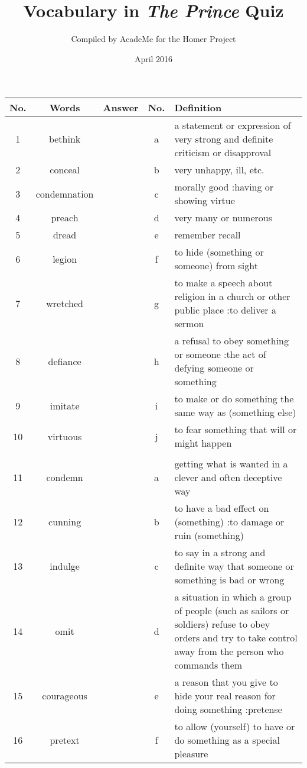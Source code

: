 \documentclass[a4paper]{article}
\title{Vocabulary in \textit{The Prince} Quiz}
\author{Compiled by AcadeMe for the Homer Project}
\date{April 2016}
\begin{document}
\maketitle
\begin{center}
\begin{tabular}{|c|c|c|c|m{}|}
\hline
No. & Words & Answer & No. & Definition \\
\hline
 1 & bethink & & a &  a statement or expression of very strong and definite criticism or disapproval \\
\hline
 2 & conceal & & b &  very unhappy, ill, etc. \\
\hline
 3 & condemnation & & c &  morally good :having or showing virtue \\
\hline
 4 & preach & & d &  very many or numerous \\
\hline
 5 & dread & & e &  remember recall\\
\hline
 6 & legion & & f &  to hide (something or someone) from sight \\
\hline
 7 & wretched & & g &  to make a speech about religion in a church or other public place :to deliver a sermon \\
\hline
 8 & defiance & & h &  a refusal to obey something or someone :the act of defying someone or something \\
\hline
 9 & imitate & & i &  to make or do something the same way as (something else) \\
\hline
 10 & virtuous & & j &  to fear something that will or might happen \\
\hline
 & & & & \\
\hline
 11 & condemn & & a &  getting what is wanted in a clever and often deceptive way \\
\hline
 12 & cunning & & b &  to have a bad effect on (something) :to damage or ruin (something) \\
\hline
 13 & indulge & & c &  to say in a strong and definite way that someone or something is bad or wrong \\
\hline
 14 & omit & & d &  a situation in which a group of people (such as sailors or soldiers) refuse to obey orders and try to take control away from the person who commands them \\
\hline
 15 & courageous & & e &  a reason that you give to hide your real reason for doing something :pretense \\
\hline
 16 & pretext & & f &  to allow (yourself) to have or do something as a special pleasure \\

\end{tabular}
\end{center}
\end{document}
